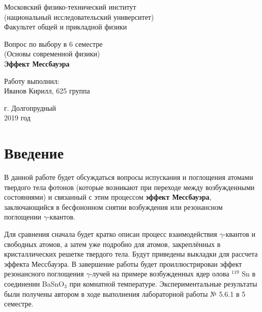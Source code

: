 \documentclass[12pt]{kiarticle}
\newcommand{\ga}{\ensuremath{\gamma}}
\begin{document}
	
	\begin{titlepage}
	\begin{center}
		\large 	Московский физико-технический институт \\
		(национальный исследовательский университет) \\
		Факультет общей и прикладной физики \\
		\vspace{0.2cm}
		
		\vspace{4.5cm}
		Вопрос по выбору в 6 семестре \\ \vspace{0.2cm}
		\large (Основы современной физики) \\ \vspace{0.2cm}
		\LARGE \textbf{Эффект Мессбауэра}
	\end{center}
	\vspace{2.3cm} \large
	
	\begin{center}
		Работу выполнил: \\
		Иванов Кирилл,
		625 группа
		\vspace{10mm}		
		
	\end{center}
	
	\begin{center} \vspace{60mm}
		г. Долгопрудный \\
		2019 год
	\end{center}
\end{titlepage}



\section{Введение}

В данной работе будет обсуждаться вопросы испускания и поглощения атомами твердого тела фотонов (которые возникают при переходе между возбужденными состояниями) и связанный с этим процессом \textbf{эффект Мессбауэра}, заключающийся в бесфононном снятии возбуждения или резонансном поглощении \ga-квантов.

Для сравнения сначала будет кратко описан процесс взаимодействия \ga-квантов и свободных атомов, а затем уже подробно для атомов, закреплённых в кристаллических решетке твердого тела. Будут приведены выкладки для рассчета эффекта Мессбауэра. В завершение работы будет проиллюстрирован эффект резонансного поглощения \ga-лучей на примере возбужденных ядер олова $ ^{119} $ Sn в соединении BaSnO$_3$ при комнатной температуре. Экспериментальные результаты были получены автором в ходе выполнения лабораторной работы № 5.6.1 в 5 семестре. 
\end{document}
